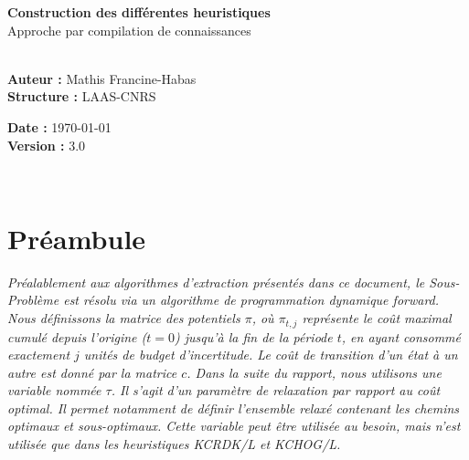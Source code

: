\documentclass[11pt,a4paper]{article}
\begin{document}
\begin{center}
    {\color{mainblue}\LARGE\bfseries Construction des différentes heuristiques}\\[0.3cm]
    {\color{slate}\large Approche par compilation de connaissances}\\[0.5cm]
    \noindent\makebox[\linewidth]{\color{bordergrey}\rule{\linewidth}{1pt}}\\[0.2cm]
    \begin{minipage}{0.48\textwidth}
        \begin{flushleft} \small
            \textbf{Auteur :} Mathis Francine-Habas \\
            \textbf{Structure :} LAAS-CNRS
        \end{flushleft}
    \end{minipage}
    \hfill
    \begin{minipage}{0.48\textwidth}
        \begin{flushright} \small
            \textbf{Date :} \today \\
            \textbf{Version :} 3.0
        \end{flushright}
    \end{minipage}\\[0.1cm]
    \noindent\makebox[\linewidth]{\color{bordergrey}\rule{\linewidth}{1pt}}
\end{center}

\vspace*{\fill}
\tableofcontents
\vspace*{\fill}

\newpage
\section{Préambule}

\textit{Préalablement aux algorithmes d'extraction présentés dans ce document, le Sous-Problème est résolu via un algorithme de programmation dynamique \textit{forward}. Nous définissons la matrice des potentiels $\pi$, où $\pi_{t,j}$ représente le coût maximal cumulé depuis l'origine ($t=0$) jusqu'à la fin de la période $t$, en ayant consommé exactement $j$ unités de budget d'incertitude. Le coût de transition d'un état à un autre est donné par la matrice $c$. Dans la suite du rapport, nous utilisons une variable nommée $\tau$. Il s'agit d'un paramètre de relaxation par rapport au coût optimal. Il permet notamment de définir l'ensemble relaxé contenant les chemins optimaux et sous-optimaux. Cette variable peut être utilisée au besoin, mais n'est utilisée que dans les heuristiques KCRDK/L et KCHOG/L.}
\end{document}
